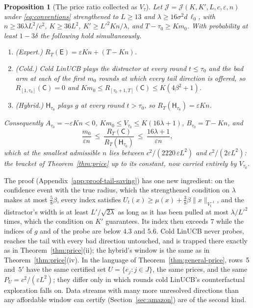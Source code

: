 \documentclass{article}
\newtheorem{proposition}{Proposition}
\theoremstyle{definition}
\theoremstyle{remark}
\newcommand{\eps}{\varepsilon}
\theoremstyle{remark}
\newcommand{\Cold}{\mathsf{C}}
\newcommand{\Exp}{\mathsf{E}}
\newcommand{\Hyb}{\mathsf{H}}
\begin{document}
\begin{proposition}[The price ratio collected as $V_\tau$]
\label{prop:cat-tail-saving}
Let $\mathcal J=\mathcal J(K,K',L,c,\eps,n)$ under \eqref{eq:conventions}
strengthened to $L\ge13$ and $\lambda\ge16\sigma^2d\,\ell_0$, with
$n\ge36\lambda L^2/c^2$, $K\ge36L^2$, $K'\ge L'^2Kn/\lambda$, and
$T-\tau_0\ge Km_0$. With probability at least $1-3\delta$ the following hold
simultaneously.
\begin{enumerate}[itemsep=1pt,topsep=1pt,leftmargin=*]
\item[(i)] \emph{(Expert.)} $R_T(\Exp)=\eps Kn+(T-Kn)$.
\item[(ii)] \emph{(Cold.)} Cold LinUCB plays the distractor at every round
$t\le\tau_0$ and the bad arm at each of the first $m_0$ rounds at which every
tail direction is offered, so $R_{[1,\tau_0]}(\Cold)=0$ and
$Km_0\le R_{[\tau_0+1,T]}(\Cold)\le K(4\beta^2+1)$.
\item[(iii)] \emph{(Hybrid.)} $\Hyb_{\tau_0}$ plays $g$ at every round
$t>\tau_0$, so $R_T(\Hyb_{\tau_0})=\eps Kn$.
\end{enumerate}
Consequently $A_{\tau_0}=-\eps Kn<0$, $Km_0\le V_{\tau_0}\le K(16\lambda+1)$,
$B_{\tau_0}=T-Kn$, and
\[
\frac{m_0}{\eps n}\ \le\ \frac{R_T(\Cold)}{R_T(\Hyb_{\tau_0})}\ \le\ \frac{16\lambda+1}{\eps n},
\]
which at the smallest admissible $n$ lies between $c^2/(2220\,\eps L^2)$ and
$c^2/(2\eps L^2)$: the bracket of Theorem~\ref{thm:price} up to its constant,
now carried entirely by $V_{\tau_0}$.
\end{proposition}

The proof (Appendix~\ref{app:proof-tail-saving}) has one new ingredient: on
the confidence event with the true radius, which the strengthened condition
on $\lambda$ makes at most $\tfrac58\beta$, every index satisfies
$U_t(x)\ge\mu(x)+\tfrac38\beta\|x\|_{V_t^{-1}}$, and the distractor's width is
at least $L'/\sqrt{2\lambda}$ as long as it has been pulled at most
$\lambda/L'^2$ times, which the condition on $K'$ guarantees. Its index then
exceeds $7$ while the indices of $g$ and of the probe are below $4.3$ and
$5.6$. Cold LinUCB never probes, reaches the tail with every bad direction
untouched, and is trapped there exactly as in Theorem~\ref{thm:price}(ii);
the hybrid's window is the same as in Theorem~\ref{thm:price}(iv). In the
language of Theorem~\ref{thm:general-price}, rows~5 and~$5'$ have the same
certified set $U=\{e_j:j\in J\}$, the same prices, and the same $P_U=c^2/(\eps L^2)$;
they differ only in which rounds cold LinUCB's counterfactual exploration
falls on. Data streams with many more unresolved directions than any
affordable window can certify (Section~\ref{sec:amazon}) are of the second
kind.
\end{document}

